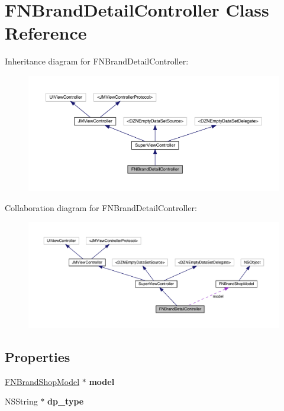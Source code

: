 \hypertarget{interface_f_n_brand_detail_controller}{}\section{F\+N\+Brand\+Detail\+Controller Class Reference}
\label{interface_f_n_brand_detail_controller}


Inheritance diagram for F\+N\+Brand\+Detail\+Controller\+:\nopagebreak
\begin{figure}[H]
\begin{center}
\leavevmode
\includegraphics[width=350pt]{interface_f_n_brand_detail_controller__inherit__graph}
\end{center}
\end{figure}


Collaboration diagram for F\+N\+Brand\+Detail\+Controller\+:\nopagebreak
\begin{figure}[H]
\begin{center}
\leavevmode
\includegraphics[width=350pt]{interface_f_n_brand_detail_controller__coll__graph}
\end{center}
\end{figure}
\subsection*{Properties}
\begin{DoxyCompactItemize}
\item 
\mbox{\label{interface_f_n_brand_detail_controller_a4303f7d87488a9be18dbfb01d0effae7}} 
\mbox{\hyperlink{interface_f_n_brand_shop_model}{F\+N\+Brand\+Shop\+Model}} $\ast$ {\bfseries model}
\item 
\mbox{\label{interface_f_n_brand_detail_controller_a9478770b1f612a1b87f8f1c5313ee75d}} 
N\+S\+String $\ast$ {\bfseries dp\+\_\+type}
\end{DoxyCompactItemize}
